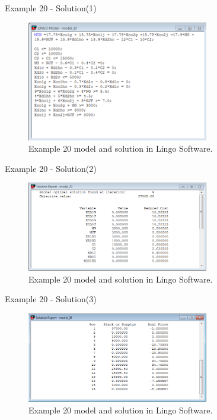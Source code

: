 \begin{frame}{Example 20 - Solution(1)}
\begin{figure}
    \includegraphics[width=300px]{slides/ex20/screenshot_a.png}
    \caption{Example 20 model and solution in Lingo Software.}
\end{figure}
\end{frame}

\begin{frame}{Example 20 - Solution(2)}
\begin{figure}
    \includegraphics[width=300px]{slides/ex20/screenshot_b.png}
    \caption{Example 20 model and solution in Lingo Software.}
\end{figure}
\end{frame}

\begin{frame}{Example 20 - Solution(3)}
\begin{figure}
    \includegraphics[width=300px]{slides/ex20/screenshot_c.png}
    \caption{Example 20 model and solution in Lingo Software.}
\end{figure}
\end{frame}
